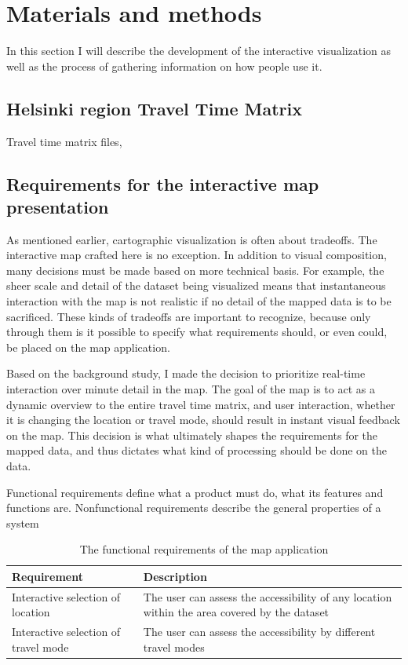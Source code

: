 \section{Materials and methods}
In this section I will describe the development of the interactive visualization
as well as the process of gathering information on how people use it.

\subsection{Helsinki region Travel Time Matrix}
Travel time matrix files,

\subsection{Requirements for the interactive map presentation}

As mentioned earlier, cartographic visualization is often about tradeoffs.
The interactive map crafted here is no exception.
In addition to visual composition,  %
many decisions must be made based on more technical basis.
For example, the sheer scale and detail of the dataset being visualized
means that instantaneous interaction with the map is not realistic
if no detail of the mapped data is to be sacrificed.
These kinds of tradeoffs are important to recognize,
because only through them is it possible to specify what
requirements should, or even could, be placed on the map application.

Based on the background study,  %
I made the decision to prioritize real-time interaction over minute detail in the map.
The goal of the map is to act as a dynamic overview to the entire travel time matrix,
and user interaction, whether it is changing the location or travel mode,
should result in instant visual feedback on the map.
This decision is what ultimately shapes the requirements for the mapped data,
and thus dictates what kind of processing should be done on the data.

Functional requirements define what a product must do,
what its features and functions are.
Nonfunctional requirements describe the general properties of a system

\begin{table}[h]
	\centering
	\begin{tabular}{ | L{0.3\textwidth} | L{0.6\textwidth} | }
		\hline
		Requirement
		& Description
		\\
		\hline
		\hline
		Interactive selection of location
		& The user can assess the accessibility of any location within the area covered by the dataset
		\\
		\hline
		Interactive selection of travel mode
		& The user can assess the accessibility by different travel modes
		\\
		\hline
	\end{tabular}
	\caption{The functional requirements of the map application}
	\label{tab:functional requirements}
\end{table}

